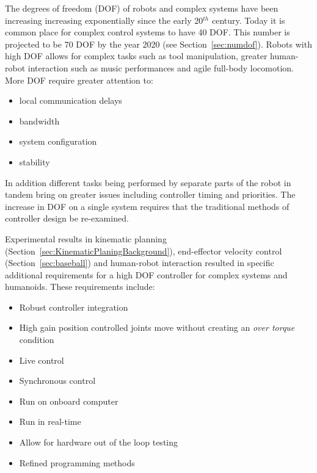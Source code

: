 The degrees of freedom (DOF) of robots and complex systems have been increasing increasing exponentially since the early 20$^{th}$ century.
Today it is common place for complex control systems to have 40 DOF. 
This number is projected to be 70 DOF by the year 2020 (see Section~\ref{sec:numdof}).
Robots with high DOF allows for complex tasks such as tool manipulation\cite{lofaroRAM2013,lofaroTePRA2013HuboAch,lofaroTePRA2013Valve,gtechIK}, greater human-robot interaction such as music performances\cite{lofaroEURASIP2011, 6094987,lofaroIASTED2011,5686847} and agile full-body locomotion\cite{lofaroHumanoids2012,lofaroGamesRobot,tepraLadder2013}.
More DOF require greater attention to:




\begin{multicols}{2}
\begin{itemize}
\item local communication delays
\item bandwidth
\item system configuration
\item stability
\end{itemize}
\end{multicols}


In addition different tasks being performed by separate parts of the robot in tandem bring on greater issues including controller timing and priorities.
The increase in DOF on a single system requires that the traditional methods of controller design be re-examined.

Experimental results in kinematic planning (Section~\ref{sec:KinematicPlaningBackground}), end-effector velocity control (Section~\ref{sec:baseball}) and human-robot interaction\cite{5686847} resulted in specific additional requirements for a high DOF controller for complex systems and humanoids. 
These requirements include:
\begin{multicols}{2}
\begin{itemize}
\item Robust controller integration 
\item High gain position controlled joints move without creating an \textit{over torque} condition
\item Live control
\item Synchronous control
\item Run on onboard computer
\item Run in real-time
\item Allow for hardware out of the loop testing
\item Refined programming methods
\end{itemize}
\end{multicols}

